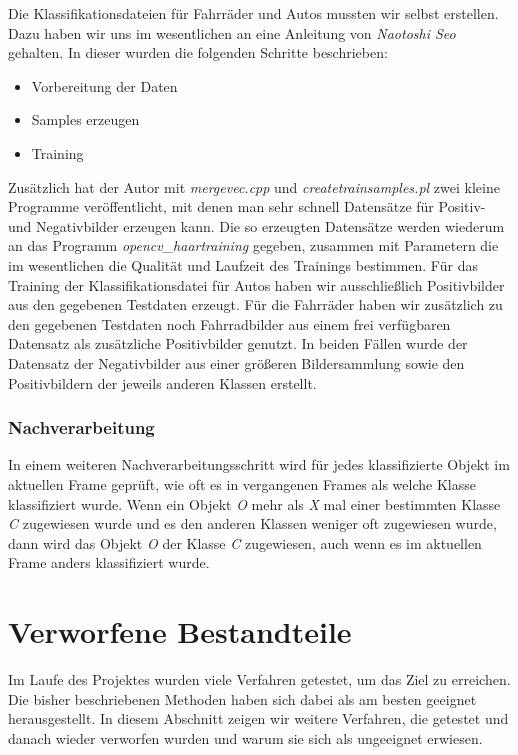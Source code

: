 \documentclass[conference]{IEEEtran}
\begin{document}
Die Klassifikationsdateien für Fahrräder und Autos mussten wir selbst erstellen.
Dazu haben wir uns im wesentlichen an eine Anleitung\cite{Seo:Haartraining} von \textit{Naotoshi Seo} gehalten. In dieser wurden die folgenden Schritte beschrieben:
\begin{itemize}
	\item Vorbereitung der Daten
	\item Samples erzeugen
	\item Training
\end{itemize}
Zusätzlich hat der Autor mit \textit{mergevec.cpp} und \textit{createtrainsamples.pl} zwei kleine Programme veröffentlicht, mit denen man sehr schnell Datensätze für Positiv- und Negativbilder erzeugen kann. Die so erzeugten Datensätze werden wiederum an das Programm \textit{opencv\_haartraining} gegeben, zusammen mit Parametern die im wesentlichen die Qualität und Laufzeit des Trainings bestimmen.
Für das Training der Klassifikationsdatei für Autos haben wir ausschließlich Positivbilder aus den gegebenen Testdaten erzeugt. Für die Fahrräder haben wir zusätzlich zu den gegebenen Testdaten noch Fahrradbilder aus einem frei verfügbaren Datensatz\cite{Caltech256} als zusätzliche Positivbilder genutzt. In beiden Fällen wurde der Datensatz der Negativbilder aus einer größeren Bildersammlung sowie den Positivbildern der jeweils anderen Klassen erstellt.

\subsubsection{Nachverarbeitung}

In einem weiteren Nachverarbeitungsschritt wird für jedes klassifizierte Objekt im aktuellen Frame geprüft, wie oft es in vergangenen Frames als welche Klasse klassifiziert wurde. Wenn ein Objekt \textit{O} mehr als \textit{X} mal einer bestimmten Klasse \textit{C} zugewiesen wurde und es den anderen Klassen weniger oft zugewiesen wurde, dann wird das Objekt \textit{O} der Klasse \textit{C} zugewiesen, auch wenn es im aktuellen Frame anders klassifiziert wurde.



\section{Verworfene Bestandteile}

Im Laufe des Projektes wurden viele Verfahren getestet, um das Ziel zu erreichen. Die bisher beschriebenen Methoden haben sich dabei als am besten geeignet herausgestellt. In diesem Abschnitt zeigen wir weitere Verfahren, die getestet und danach wieder verworfen wurden und warum sie sich als ungeeignet erwiesen.
\end{document}
